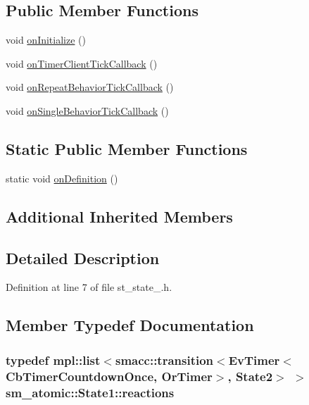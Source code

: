 \subsection*{Public Member Functions}
\begin{DoxyCompactItemize}
\item 
void \hyperlink{structsm__atomic_1_1State1_a13084492414b7b478f9f4b78a749c020}{on\+Initialize} ()
\item 
void \hyperlink{structsm__atomic_1_1State1_adea28f0a0fcedb210a29656f53aeee09}{on\+Timer\+Client\+Tick\+Callback} ()
\item 
void \hyperlink{structsm__atomic_1_1State1_a9d2c943f02a8e0f1d7b86132ada1c6e0}{on\+Repeat\+Behavior\+Tick\+Callback} ()
\item 
void \hyperlink{structsm__atomic_1_1State1_a9cb95d91cf5a22f0d9d079dc04bf58aa}{on\+Single\+Behavior\+Tick\+Callback} ()
\end{DoxyCompactItemize}
\subsection*{Static Public Member Functions}
\begin{DoxyCompactItemize}
\item 
static void \hyperlink{structsm__atomic_1_1State1_ad422837dc6136634e7fc8253658ec612}{on\+Definition} ()
\end{DoxyCompactItemize}
\subsection*{Additional Inherited Members}


\subsection{Detailed Description}


Definition at line 7 of file st\+\_\+state\+\_.\+h.



\subsection{Member Typedef Documentation}
\subsubsection[{\texorpdfstring{reactions}{reactions}}]{\setlength{\rightskip}{0pt plus 5cm}typedef mpl\+::list$<${\bf smacc\+::transition}$<${\bf Ev\+Timer}$<${\bf Cb\+Timer\+Countdown\+Once}, {\bf Or\+Timer}$>$, {\bf State2}$>$ $>$ {\bf sm\+\_\+atomic\+::\+State1\+::reactions}}\hypertarget{structsm__atomic_1_1State1_afe4b84d837f9f361aebaf0600728cdd8}{}\label{structsm__atomic_1_1State1_afe4b84d837f9f361aebaf0600728cdd8}


